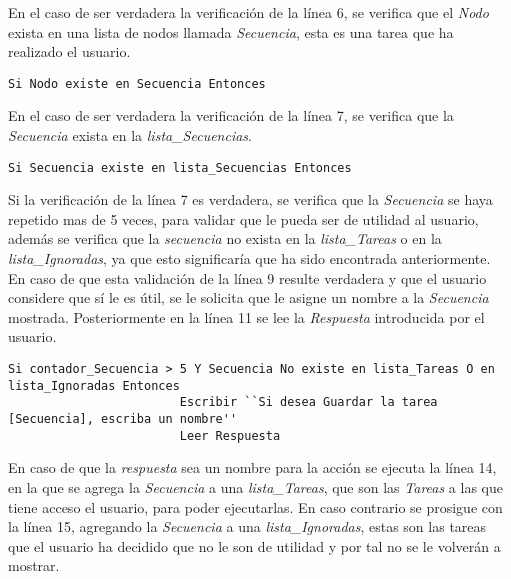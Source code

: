 En el caso de ser verdadera la verificaci\'on de la l\'inea 6, se verifica 
 que el \emph{Nodo} exista en una lista de nodos llamada \emph{Secuencia}, 
 esta es una tarea que ha realizado el usuario.

\begin{tiny}
\begin{lstlisting}[style=C]
            Si Nodo existe en Secuencia Entonces
\end{lstlisting}
\end{tiny}

En el caso de ser verdadera la verificaci\'on de la l\'inea 7, se verifica 
 que la \emph{Secuencia} exista en la \emph{lista\_Secuencias}.

\begin{tiny}
\begin{lstlisting}[style=C]
                Si Secuencia existe en lista_Secuencias Entonces
\end{lstlisting}
\end{tiny}

Si la verificaci\'on de la l\'inea 7 es verdadera, se verifica que la 
 \emph{Secuencia} se haya repetido mas de 5 veces, para validar que le pueda 
 ser de utilidad al usuario, adem\'as se verifica que la \emph{secuencia} no 
 exista en la \emph{lista\_Tareas} o en la \emph{lista\_Ignoradas}, ya que 
 esto significar\'ia que ha sido encontrada anteriormente. 
 En caso de que esta validaci\'on de la l\'inea 9 resulte verdadera
 y que el usuario considere que s\'i le es \'util, se le solicita 
 que le asigne un nombre a la \emph{Secuencia} mostrada. Posteriormente en la 
 l\'inea 11 se lee la \emph{Respuesta} introducida por el usuario.

\begin{tiny}
\begin{lstlisting}[style=C]
                    Si contador_Secuencia > 5 Y Secuencia No existe en lista_Tareas O en lista_Ignoradas Entonces
                        Escribir ``Si desea Guardar la tarea [Secuencia], escriba un nombre''
                        Leer Respuesta
\end{lstlisting}
\end{tiny}

En caso de que la \emph{respuesta} sea un nombre para la acci\'on se ejecuta 
 la l\'inea 14, en la que se agrega la \emph{Secuencia} a una 
 \emph{lista\_Tareas}, que son las \emph{Tareas} a las que tiene acceso el 
 usuario, para poder ejecutarlas. En caso contrario se prosigue con la 
 l\'inea 15, agregando la \emph{Secuencia} a una \emph{lista\_Ignoradas}, 
 estas son las tareas que el usuario ha decidido que no le son de utilidad y 
 por tal no se le volver\'an a mostrar.

